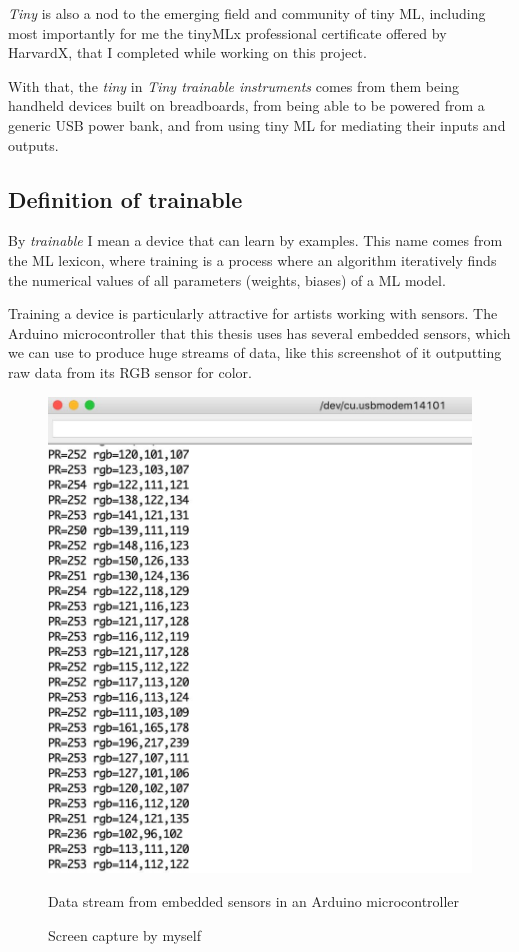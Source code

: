 \emph{Tiny} is also a nod to the emerging field and community of tiny \acrshort{ML}, including most importantly for me the tinyMLx professional certificate\cite{website-edx-harvardx-tinymlx-professional-certificate} offered by HarvardX, that I completed while working on this project.

With that, the \emph{tiny} in \emph{Tiny trainable instruments} comes from them being handheld devices built on breadboards, from being able to be powered from a generic USB power bank, and from using tiny \acrshort{ML} for mediating their inputs and outputs.

\subsection{Definition of trainable}

By \emph{trainable} I mean a device that can learn by examples. This name comes from the \acrshort{ML} lexicon, where training is a process where an algorithm  iteratively finds the numerical values of all parameters (weights, biases) of a \acrshort{ML} model.

Training a device is particularly attractive for artists working with sensors. The Arduino microcontroller that this thesis uses has several embedded sensors, which we can use to produce huge streams of data, like this screenshot of it outputting raw data from its \acrshort{RGB} sensor for color.

\begin{figure}[ht]
  \centering
  \includegraphics[width=0.75\linewidth,height=0.40\textheight,keepaspectratio]{images/arduino-data-stream.jpg}
  \caption{Data stream from embedded sensors in an Arduino microcontroller}
  \caption*{Screen capture by myself}
  \label{fig:arduino-data-stream}
\end{figure}

